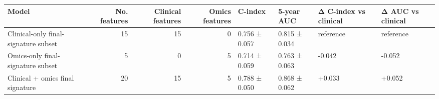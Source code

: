 \begin{tabular}{lrrrllll}
\toprule
Model & No. features & Clinical features & Omics features & C-index & 5-year AUC & Δ C-index vs clinical & Δ AUC vs clinical \\
\midrule
Clinical-only final-signature subset & 15 & 15 & 0 & 0.756 ± 0.057 & 0.815 ± 0.034 & reference & reference \\
Omics-only final-signature subset & 5 & 0 & 5 & 0.714 ± 0.059 & 0.763 ± 0.063 & -0.042 & -0.052 \\
Clinical + omics final signature & 20 & 15 & 5 & 0.788 ± 0.050 & 0.868 ± 0.062 & +0.033 & +0.052 \\
\bottomrule
\end{tabular}
